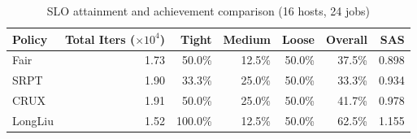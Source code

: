 \begin{table}[t]
\centering
\caption{SLO attainment and achievement comparison (16 hosts, 24 jobs)}
\label{tab:slo_16host}
\begin{tabular}{l|r|r|r|r|r|r}
\hline
Policy & Total Iters ($\times 10^4$) & Tight & Medium & Loose & Overall & SAS \\
\hline
Fair & 1.73 & 50.0\% & 12.5\% & 50.0\% & 37.5\% & 0.898 \\
SRPT & 1.90 & 33.3\% & 25.0\% & 50.0\% & 33.3\% & 0.934 \\
CRUX & 1.91 & 50.0\% & 25.0\% & 50.0\% & 41.7\% & 0.978 \\
LongLiu & 1.52 & 100.0\% & 12.5\% & 50.0\% & 62.5\% & 1.155 \\
\hline
\end{tabular}
\end{table}
